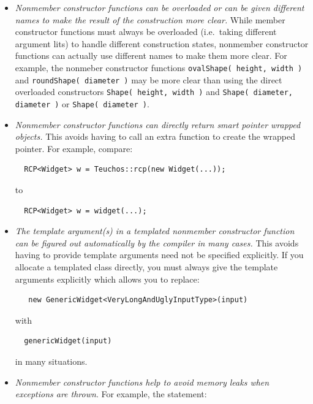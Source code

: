\documentclass[pdf,ps2pdf,11pt]{SANDreport}
\begin{document}
\begin{itemize}

{}\item\textit{Nonmember constructor functions can be overloaded or can be
given different names to make the result of the construction more clear.}
While member constructor functions must always be overloaded (i.e.\ taking
different argument lits) to handle different construction states, nonmember
constructor functions can actually use different names to make them more
clear.  For example, the nonmeber constructor functions {}\texttt{ovalShape(
height, width )} and {}\texttt{roundShape( diameter )} may be more clear than
using the direct overloaded constructors {}\texttt{Shape( height, width )} and
{}\texttt{Shape( diameter, diameter )} or {}\texttt{Shape( diameter )}.

{}\item\textit{Nonmember constructor functions can directly return smart
pointer wrapped objects.}  This avoids having to call an extra function to
create the wrapped pointer.  For example, compare:

{\small\begin{verbatim}
  RCP<Widget> w = Teuchos::rcp(new Widget(...));
\end{verbatim}}

to

{\small\begin{verbatim}
  RCP<Widget> w = widget(...);
\end{verbatim}}

{}\item\textit{The template argument(s) in a templated nonmember constructor
function can be figured out automatically by the compiler in many cases.}
This avoids having to provide template arguments need not be specified
explicitly.  If you allocate a templated class directly, you must always give
the template arguments explicitly which allows you to replace:

{\small\begin{verbatim}
   new GenericWidget<VeryLongAndUglyInputType>(input)
\end{verbatim}}

with

{\small\begin{verbatim}
  genericWidget(input)
\end{verbatim}}

in many situations.

{}\item\textit{Nonmember constructor functions help to avoid memory leaks when
exceptions are thrown}.  For example, the statement:


\end{itemize}
\end{document}
